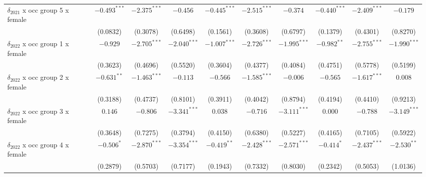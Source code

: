\begin{tabular}{l|ccc|ccc|ccc}
$\delta_{2021}$ x occ group 5 x female &          $-0.493^{***}$ &  $-2.375^{***}$ &        $-0.456$ &           $-0.445^{***}$ &  $-2.515^{***}$ &        $-0.374$ &           $-0.440^{***}$ &  $-2.409^{***}$ &        $-0.179$ \\
                                       &                (0.0832) &        (0.3078) &        (0.6498) &                 (0.1561) &        (0.3608) &        (0.6797) &                 (0.1379) &        (0.4301) &        (0.8270) \\
$\delta_{2022}$ x occ group 1 x female &                $-0.929$ &  $-2.705^{***}$ &  $-2.040^{***}$ &           $-1.007^{***}$ &  $-2.726^{***}$ &  $-1.995^{***}$ &            $-0.982^{**}$ &  $-2.755^{***}$ &  $-1.990^{***}$ \\
                                       &                (0.3623) &        (0.4696) &        (0.5520) &                 (0.3604) &        (0.4377) &        (0.4084) &                 (0.4751) &        (0.5778) &        (0.5199) \\
$\delta_{2022}$ x occ group 2 x female &           $-0.631^{**}$ &  $-1.463^{***}$ &        $-0.113$ &                 $-0.566$ &  $-1.585^{***}$ &        $-0.006$ &                 $-0.565$ &  $-1.617^{***}$ &         $0.008$ \\
                                       &                (0.3188) &        (0.4737) &        (0.8101) &                 (0.3911) &        (0.4042) &        (0.8794) &                 (0.4194) &        (0.4410) &        (0.9213) \\
$\delta_{2022}$ x occ group 3 x female &                 $0.146$ &        $-0.806$ &  $-3.341^{***}$ &                  $0.038$ &        $-0.716$ &  $-3.111^{***}$ &                  $0.000$ &        $-0.788$ &  $-3.149^{***}$ \\
                                       &                (0.3648) &        (0.7275) &        (0.3794) &                 (0.4150) &        (0.6380) &        (0.5227) &                 (0.4165) &        (0.7105) &        (0.5922) \\
$\delta_{2022}$ x occ group 4 x female &              $-0.506^*$ &  $-2.870^{***}$ &  $-3.354^{***}$ &            $-0.419^{**}$ &  $-2.428^{***}$ &  $-2.571^{***}$ &               $-0.414^*$ &  $-2.437^{***}$ &   $-2.530^{**}$ \\
                                       &                (0.2879) &        (0.5703) &        (0.7177) &                 (0.1943) &        (0.7332) &        (0.8030) &                 (0.2342) &        (0.5053) &        (1.0136) \\

\end{tabular}
